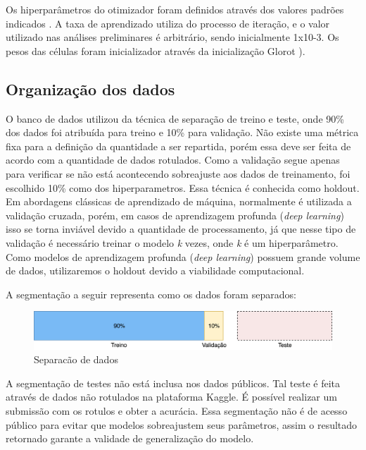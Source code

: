 \documentclass[12pt]{article}
\begin{document}
Os hiperparâmetros do otimizador foram definidos através dos valores padrões indicados \cite{DBLP:journals/corr/KingmaB14}. A taxa de aprendizado utiliza do processo de iteração, e o valor utilizado nas análises preliminares é arbitrário, sendo inicialmente 1x10-3. Os pesos das células foram inicializador através da inicialização Glorot \cite{glorot:10}).

\subsection{Organização dos dados}

O banco de dados utilizou da técnica de separação de treino e teste, onde 90\% dos dados foi atribuída para treino e 10\% para validação. Não existe uma métrica fixa para a definição da quantidade a ser repartida, porém essa deve ser feita de acordo com a quantidade de dados rotulados. Como a validação segue apenas para verificar se não está acontecendo sobreajuste aos dados de treinamento, foi escolhido 10\% como dos hiperparametros. Essa técnica é conhecida como holdout. Em abordagens clássicas de aprendizado de máquina, normalmente é utilizada a validação cruzada, porém, em casos de aprendizagem profunda (\textit{deep learning}) isso se torna inviável devido a quantidade de processamento, já que nesse tipo de validação é necessário treinar o modelo \textit{k} vezes, onde \textit{k} é um hiperparâmetro. Como modelos de aprendizagem profunda (\textit{deep learning}) possuem grande volume de dados, utilizaremos o holdout devido a viabilidade computacional.

A segmentação a seguir representa como os dados foram separados:

\begin{figure}[!htb]
\centering
\includegraphics[width=1\textwidth]{images/datasplit.png}
\caption{Separacão de dados}
\label{fig:datasplit}
\end{figure}

A segmentação de testes não está inclusa nos dados públicos. Tal teste é feita através de dados não rotulados na plataforma Kaggle. É possível realizar um submissão com os rotulos e obter a acurácia. Essa segmentação não é de acesso público para evitar que modelos sobreajustem seus parâmetros, assim o resultado retornado garante a validade de generalização do modelo.
\end{document}
